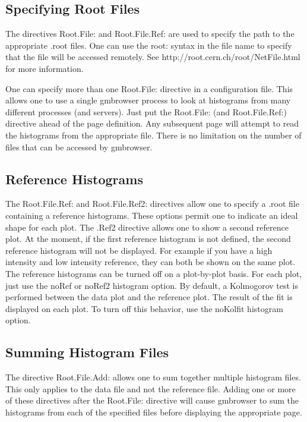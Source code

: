 \documentclass[12pt]{article}
\begin{document}
\subsection[Specifying Root Files]{Specifying Root Files}
The directives Root.File: and Root.File.Ref: are used to 
specify the path to the appropriate .root files. One can use
the root:  syntax in the file name to specify that
the file will be accessed remotely. See http://root.cern.ch/root/NetFile.html
for more information.

One can specify more than one Root.File: directive in a configuration
file. This allows one to use a single gmbrowser process to look at
histograms from many different processes (and servers). Just put the
Root.File: (and Root.File.Ref:) directive ahead of the page definition.
Any subsequent page will attempt to read the histograms from
the appropriate file. There is no limitation on the number of 
files that can be accessed by gmbrowser.

\subsection[Reference Histograms]{Reference Histograms}
The Root.File.Ref: and Root.File.Ref2: directives allow one to 
specify a .root file containing a reference histograms. These
options permit one to indicate an ideal shape for each plot.
The .Ref2 directive allows one to show a second reference plot.
At the moment, if the first reference histogram is not defined,
the second reference histogram will not be displayed.
For example if you have a high intensity and low intensity reference,
they can both be shown on the same plot. The reference histograms
can be turned off on a plot-by-plot basis. For each plot,
just use the noRef or noRef2 histogram option. By default,
a Kolmogorov test is performed between the data plot and the
reference plot. The result of the fit is displayed on each
plot. To turn off this behavior, use the noKolfit histogram
option.

\subsection[Summing Histogram Files]{Summing Histogram Files}
The directive Root.File.Add: allows one to sum together multiple
histogram files. This only applies to the data file and not the
reference file. Adding one or more of these directives after
the Root.File: directive will cause gmbrowser to sum the histograms
from each of the specified files before displaying the appropriate
page. 
\end{document}
